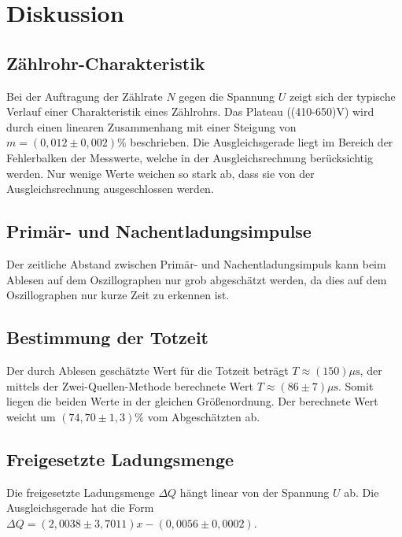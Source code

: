 \section{Diskussion}
\label{sec:Diskussion}
\subsection{Zählrohr-Charakteristik}
Bei der Auftragung der Zählrate $N$ gegen die Spannung $U$ zeigt sich der typische Verlauf einer Charakteristik eines Zählrohrs. Das Plateau ((410-650)\si{\volt}) wird durch einen linearen Zusammenhang  mit einer Steigung von $m=(0,012 \pm 0,002)\%$ beschrieben.  Die Ausgleichsgerade liegt im Bereich der Fehlerbalken der Messwerte, welche in der Ausgleichsrechnung berücksichtig werden. Nur wenige Werte weichen so stark ab, dass sie von der Ausgleichsrechnung ausgeschlossen werden.
\subsection{Primär- und Nachentladungsimpulse}
Der zeitliche Abstand zwischen Primär- und Nachentladungsimpuls kann beim Ablesen auf dem Oszillographen nur grob abgeschätzt werden, da dies auf dem Oszillographen nur kurze Zeit zu erkennen ist.
\subsection{Bestimmung der Totzeit}
Der durch Ablesen geschätzte Wert für die Totzeit beträgt $ T\approx (150)\mu\si{\second}$, der mittels der Zwei-Quellen-Methode berechnete Wert $T \approx (86 \pm 7)\mu\si{\second}$. Somit liegen die beiden Werte in der gleichen Größenordnung. Der berechnete Wert weicht um $(74,70 \pm 1,3)\%$ vom Abgeschätzten ab.
\subsection{Freigesetzte Ladungsmenge}
Die freigesetzte Ladungsmenge $\Delta Q$ hängt linear von der Spannung $U$ ab. Die Ausgleichsgerade hat die Form $\Delta Q = (2,0038 \pm 3,7011)x - (0,0056\pm0,0002)$.
